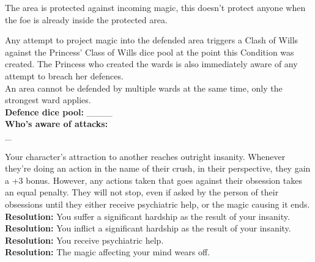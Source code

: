 \documentclass[10pt, frontgrid, backgrid]{flacards}
\begin{document}

{The area is protected against incoming magic, this doesn't protect anyone when the foe is already inside the protected area. 

Any attempt to project magic into the defended area triggers a Clash of Wills against the Princess' Class of Wills dice pool at the point this Condition was created. The Princess who created the wards is also immediately aware of any attempt to breach her defences.\\ 

An area cannot be defended by multiple wards at the same time, only the strongest ward applies. \\ 
\textbf{Defence dice pool:} \_\_\_\_ \\
\textbf{Who's aware of attacks:} \fillunderline \\ \_\fillunderline}




{Your character's attraction to another reaches outright insanity. Whenever they're doing an action in the name of their crush, in their perspective, they gain a +3 bonus. However, any actions taken that goes against their obsession takes an equal penalty. They will not stop, even if asked by the person of their obsessions until they either receive psychiatric help,  or the magic causing it ends.\\
\textbf{Resolution:} You suffer a significant hardship as the result of your insanity.\\
\textbf{Resolution:} You inflict a significant hardship as the result of your insanity.\\
\textbf{Resolution:} You receive psychiatric help.\\
\textbf{Resolution:} The magic affecting your mind wears off.}
\end{document}
